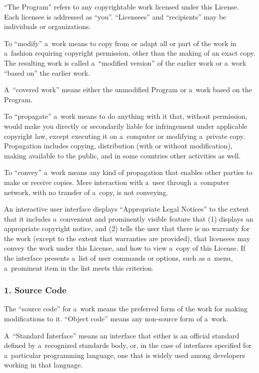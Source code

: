 \documentclass[a4paper, 11pt, twoside]{article}
\begin{document}
“The Program” refers to any copyrightable work licensed under this License. Each licensee is addressed as “you”. “Licensees” and “recipients” may be individuals or organizations.

To “modify” a~work means to copy from or adapt all or part of the work in a~fashion requiring copyright permission, other than the making of an exact copy. The resulting work is called a~“modified version” of the earlier work or a~work “based on” the earlier work.

A~“covered work” means either the unmodified Program or a~work based on the Program.

To “propagate” a~work means to do anything with it that, without permission, would make you directly or secondarily liable for infringement under applicable copyright law, except executing it on a~computer or modifying a~private copy. Propagation includes copying, distribution (with or without modification), making available to the public, and in some countries other activities as well.

To “convey” a~work means any kind of propagation that enables other parties to make or receive copies. Mere interaction with a~user through a~computer network, with no transfer of a~copy, is not conveying.

An interactive user interface displays “Appropriate Legal Notices” to the extent that it includes a~convenient and prominently visible feature that (1) displays an appropriate copyright notice, and (2) tells the user that there is no warranty for the work (except to the extent that warranties are provided), that licensees may convey the work under this License, and how to view a~copy of this License. If the interface presents a~list of user commands or options, such as a~menu, a~prominent item in the list meets this criterion.

\subsubsection{1. Source Code}

The “source code” for a~work means the preferred form of the work for making modifications to it. “Object code” means any non-source form of a~work.

A~“Standard Interface” means an interface that either is an official standard defined by a~recognized standards body, or, in the case of interfaces specified for a~particular programming language, one that is widely used among developers working in that language.
\end{document}
